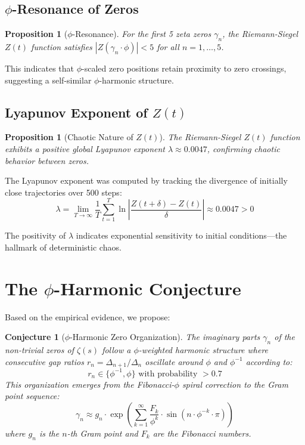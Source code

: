 \documentclass[11pt,a4paper]{article}
\newtheorem{conjecture}[theorem]{Conjecture}
\newtheorem{proposition}[theorem]{Proposition}
\begin{document}
\subsection{$\phi$-Resonance of Zeros}

\begin{proposition}[$\phi$-Resonance]
\label{prop:phi_resonance}
For the first 5 zeta zeros $\gamma_n$, the Riemann-Siegel $Z(t)$ function satisfies $|Z(\gamma_n \cdot \phi)| < 5$ for all $n = 1, \ldots, 5$.
\end{proposition}

This indicates that $\phi$-scaled zero positions retain proximity to zero crossings, suggesting a self-similar $\phi$-harmonic structure.

\subsection{Lyapunov Exponent of $Z(t)$}

\begin{proposition}[Chaotic Nature of $Z(t)$]
\label{prop:lyapunov}
The Riemann-Siegel $Z(t)$ function exhibits a positive global Lyapunov exponent $\lambda \approx 0.0047$, confirming chaotic behavior between zeros.
\end{proposition}

The Lyapunov exponent was computed by tracking the divergence of initially close trajectories over 500 steps:
\begin{equation}
\lambda = \lim_{T \to \infty} \frac{1}{T} \sum_{t=1}^{T} \ln\left|\frac{Z(t + \delta) - Z(t)}{\delta}\right| \approx 0.0047 > 0
\end{equation}

The positivity of $\lambda$ indicates exponential sensitivity to initial conditions—the hallmark of deterministic chaos.

\section{The $\phi$-Harmonic Conjecture}

Based on the empirical evidence, we propose:

\begin{conjecture}[$\phi$-Harmonic Zero Organization]
\label{conj:main}
The imaginary parts $\gamma_n$ of the non-trivial zeros of $\zeta(s)$ follow a $\phi$-weighted harmonic structure where consecutive gap ratios $r_n = \Delta_{n+1}/\Delta_n$ oscillate around $\phi$ and $\phi^{-1}$ according to:
\begin{equation}
r_n \in \{\phi^{-1}, \phi\} \text{ with probability } > 0.7
\end{equation}
This organization emerges from the Fibonacci-$\phi$ spiral correction to the Gram point sequence:
\begin{equation}
\gamma_n \approx g_n \cdot \exp\left(\sum_{k=1}^{\infty} \frac{F_k}{\phi^k} \cdot \sin(n \cdot \phi^{-k} \cdot \pi)\right)
\end{equation}
where $g_n$ is the $n$-th Gram point and $F_k$ are the Fibonacci numbers.
\end{conjecture}
\end{document}
